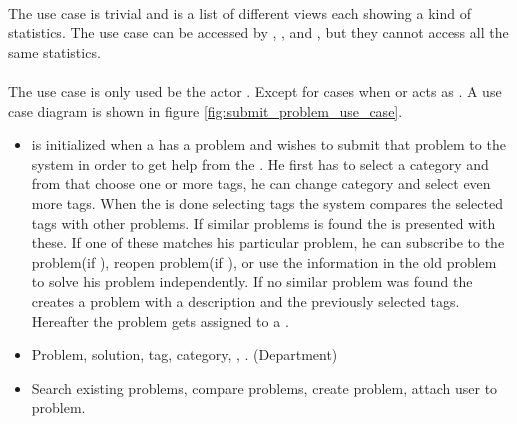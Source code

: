 
\paragraph{\gstat[c]} The use case \gstat[] is trivial and is a list of different views each showing a kind of statistics. The use case can be accessed by \sadmin{}, \aclient{}, and \astaff{}, but they cannot access all the same statistics.


\paragraph{\ucsproblem[c]} The use case \ucsproblem[] is only used be the actor \aclient. Except for cases when \astaff{} or \sadmin{}  acts as \aclient{}. A use case diagram is shown in figure \ref{fig:submit_problem_use_case}. 
\begin{itemize}
\item {} \ucsproblem[c] is initialized when a \aclient{} has a problem and wishes to submit that problem to the system in order to get help from the \astaff{}. 
He first has to select a category and from that choose one or more tags, he can change category and select even more tags. 
When the \aclient{} is done selecting tags the system compares the selected tags with other problems. 
If similar problems is found the \aclient{} is presented with these.
If one of these matches his particular problem, he can subscribe to the problem(if \open), reopen problem(if \closed{}), or use the information in the old problem to solve his problem independently. 
If no similar problem was found the \aclient{} creates a problem with a description and the previously selected tags. 
Hereafter the problem gets assigned to a \astaff{}. 

\item {} Problem, solution, tag, category, \client, \staff. (Department)

\item {} Search existing problems, compare problems, create problem, attach user to problem.
\end{itemize}

